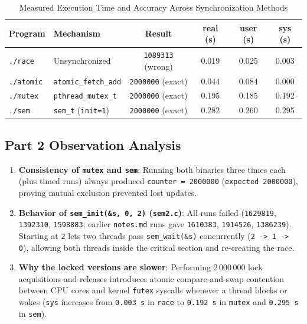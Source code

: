 \documentclass[12pt,a4paper]{article}
\begin{document}
\begin{table}[H]
\centering
\caption{Measured Execution Time and Accuracy Across Synchronization Methods}
\begin{tabularx}{\textwidth}{l >{\raggedright\arraybackslash}X c c c c}
\toprule
\textbf{Program} & \textbf{Mechanism} & \textbf{Result} & \textbf{real (s)} & \textbf{user (s)} & \textbf{sys (s)} \\
\midrule
\texttt{./race}   & Unsynchronized           & \texttt{1089313} (wrong) & 0.019 & 0.025 & 0.003 \\
\texttt{./atomic} & \texttt{atomic\_fetch\_add} & \texttt{2000000} (exact) & 0.044 & 0.084 & 0.000 \\
\texttt{./mutex}  & \texttt{pthread\_mutex\_t} & \texttt{2000000} (exact) & 0.195 & 0.185 & 0.192 \\
\texttt{./sem}    & \texttt{sem\_t} (\texttt{init=1}) & \texttt{2000000} (exact) & 0.282 & 0.260 & 0.295 \\
\bottomrule
\end{tabularx}
\end{table}

\subsection{Part 2 Observation Analysis}
\begin{enumerate}
    \item \textbf{Consistency of \texttt{mutex} and \texttt{sem}}: Running both binaries three times each (plus timed runs) always produced \texttt{counter = 2000000} (\texttt{expected 2000000}), proving mutual exclusion prevented lost updates.
    \item \textbf{Behavior of \texttt{sem\_init(\&s, 0, 2)} (\texttt{sem2.c})}: All runs failed (\texttt{1629819}, \texttt{1392310}, \texttt{1598883}; earlier \texttt{notes.md} runs gave \texttt{1610383}, \texttt{1914526}, \texttt{1386239}). Starting at \texttt{2} lets two threads pass \texttt{sem\_wait(\&s)} concurrently (\texttt{2 -> 1 -> 0}), allowing both threads inside the critical section and re-creating the race.
    \item \textbf{Why the locked versions are slower}: Performing 2\,000\,000 lock acquisitions and releases introduces atomic compare-and-swap contention between CPU cores and kernel \texttt{futex} syscalls whenever a thread blocks or wakes (\texttt{sys} increases from \texttt{0.003\,s} in \texttt{race} to \texttt{0.192\,s} in \texttt{mutex} and \texttt{0.295\,s} in \texttt{sem}).
\end{enumerate}
\end{document}
